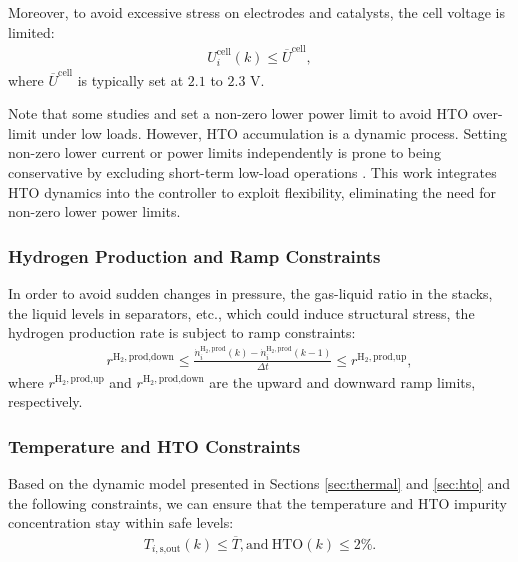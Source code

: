\documentclass[review,3p,10pt]{elsarticle}
\begin{document}
Moreover, to avoid excessive stress on electrodes and catalysts, the cell voltage is limited:
\begin{align}
  U_i^\text{cell}(k) \le \overline{U}^\text{cell}, \label{eq:limitcellvolt}
\end{align}
where $\overline{U}^\text{cell}$ is typically set at $2.1$ to $2.3$ V. 

Note that some studies \cite{rizwan2021design,chen2024enhancing,shi2023plant,li2023exploration,liang2024large} and \cite{zheng2022optimal} set a non-zero lower power limit to avoid HTO over-limit under low loads. However, HTO accumulation is a dynamic process. Setting non-zero lower current or power limits independently is prone to being conservative by excluding short-term low-load operations \cite{qiu2023extended}. 
This work integrates HTO dynamics into the controller to exploit flexibility, eliminating the need for non-zero lower power limits.

\subsubsection{Hydrogen Production and Ramp Constraints}

In order to avoid sudden changes in pressure, the gas-liquid ratio in the stacks, the liquid levels in separators, etc., which could induce structural stress, the hydrogen production rate is subject to ramp constraints:
\begin{align}
  r^{\text{H}_2,\text{prod,down}} \le \frac{\dot{n}_{i}^{\text{H}_2,\text{prod}}(k) - \dot{n}_{i}^{\text{H}_2,\text{prod}}(k-1)}{\Delta t} \le r^{\text{H}_2,\text{prod,up}} , \label{eq:limitramp}
\end{align}
\noindent
where $r^{\text{H}_2,\text{prod,up}}$ and $r^{\text{H}_2,\text{prod,down}}$  are the upward and downward ramp limits, respectively.

\subsubsection{Temperature and HTO Constraints}

Based on the dynamic model presented in Sections \ref{sec:thermal} and \ref{sec:hto} and the following constraints, we can ensure that the temperature and HTO impurity concentration stay within safe levels:
\begin{gather}
  T_{i,\text{s,out}}(k) \le \overline{T}, \text{and}\ \text{HTO}(k) \le 2\%.  \label{eq:limittemp} 
\end{gather}
\end{document}
